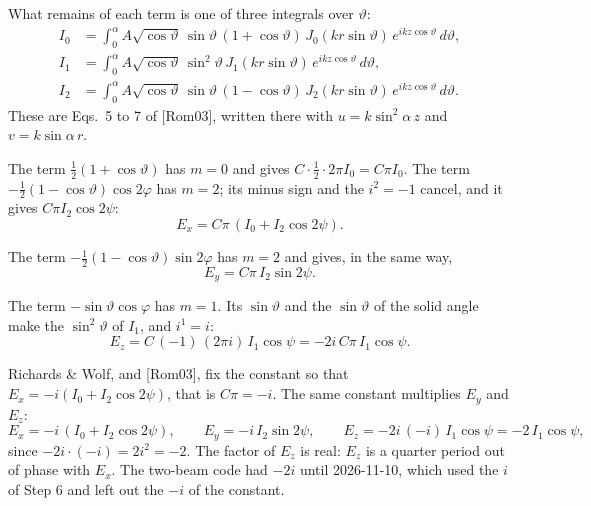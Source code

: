 \documentclass[11pt]{article}
\begin{document}
 What remains of each term is one of three integrals over $\vartheta$:
\begin{align}
I_0 &= \int_0^\alpha A\sqrt{\cos\vartheta}\,\sin\vartheta\,(1 + \cos\vartheta)\,J_0(kr\sin\vartheta)\,e^{ikz\cos\vartheta}\,d\vartheta ,\\
I_1 &= \int_0^\alpha A\sqrt{\cos\vartheta}\,\sin^2\!\vartheta\,J_1(kr\sin\vartheta)\,e^{ikz\cos\vartheta}\,d\vartheta ,\\
I_2 &= \int_0^\alpha A\sqrt{\cos\vartheta}\,\sin\vartheta\,(1 - \cos\vartheta)\,J_2(kr\sin\vartheta)\,e^{ikz\cos\vartheta}\,d\vartheta .
\end{align}
These are Eqs.~5 to 7 of [Rom03], written there with $u = k\sin^2\!\alpha\,z$ and $v = k\sin\alpha\,r$.

 The term $\frac12(1 + \cos\vartheta)$ has $m = 0$ and gives $C\cdot\frac12\cdot2\pi I_0 = C\pi I_0$.
The term $-\frac12(1 - \cos\vartheta)\cos2\varphi$ has $m = 2$; its minus sign and the $i^2 = -1$ cancel, and it
gives $C\pi I_2\cos2\psi$:
\begin{equation}E_x = C\pi\,(I_0 + I_2\cos2\psi) .\end{equation}

 The term $-\frac12(1 - \cos\vartheta)\sin2\varphi$ has $m = 2$ and gives, in the same way,
\begin{equation}E_y = C\pi\,I_2\sin2\psi .\end{equation}

 The term $-\sin\vartheta\cos\varphi$ has $m = 1$. Its $\sin\vartheta$ and the $\sin\vartheta$ of the
solid angle make the $\sin^2\!\vartheta$ of $I_1$, and $i^1 = i$:
\begin{equation}E_z = C\,(-1)\,(2\pi i)\,I_1\cos\psi = -2i\,C\pi\,I_1\cos\psi .\end{equation}

 Richards \& Wolf, and [Rom03], fix the constant so that $E_x = -i(I_0 + I_2\cos2\psi)$, that is
$C\pi = -i$. The same constant multiplies $E_y$ and $E_z$:
\begin{equation}E_x = -i\,(I_0 + I_2\cos2\psi),\qquad E_y = -i\,I_2\sin2\psi,\qquad
E_z = -2i\,(-i)\,I_1\cos\psi = -2\,I_1\cos\psi ,\label{eq:rw}\end{equation}
since $-2i\cdot(-i) = 2i^2 = -2$. The factor of $E_z$ is real: $E_z$ is a quarter period out of phase with $E_x$. The
two-beam code had $-2i$ until 2026-11-10, which used the $i$ of Step 6 and left out the $-i$ of the constant.
\end{document}
